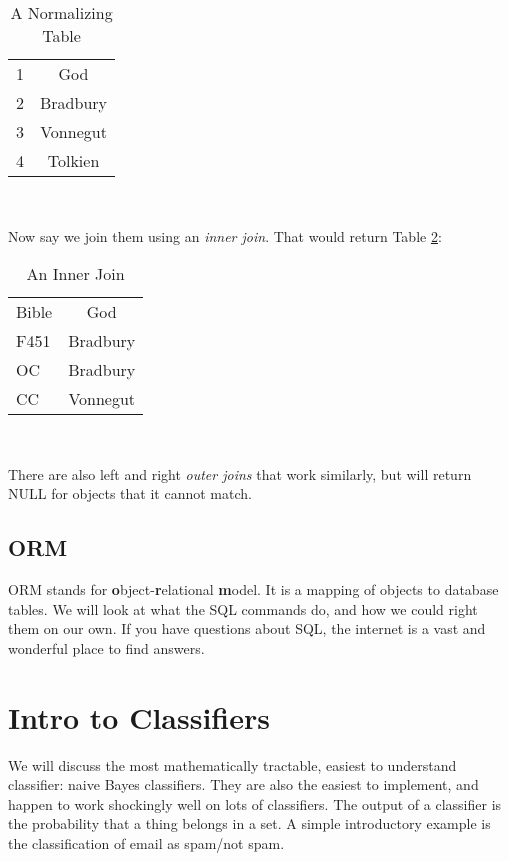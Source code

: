 \documentclass[12pt,letter]{article}
\begin{document}
\begin{table}[htbp]\centering
 \caption{A Normalizing Table}
\label{aNormalizer}
\begin{tabular}{l|c}\hline
1 & God \\
2 & Bradbury \\
3 & Vonnegut \\
4 & Tolkien \\
\hline
\end{tabular} \\
\end{table}

Now say we join them using an \emph{inner join}. That would return
Table \ref{innerjoin}:
\begin{table}[h!]\centering
 \caption{An Inner Join}
\label{innerjoin}
\begin{tabular}{l|c}\hline
Bible & God \\
F451 & Bradbury \\
OC & Bradbury \\
CC & Vonnegut \\
\hline
\end{tabular} \\
\end{table}
There are also left and right \emph{outer joins} that work similarly,
but will return NULL for objects that it cannot match.

\subsection{ORM}

ORM stands for \textbf{o}bject-\textbf{r}elational \textbf{m}odel. It is a mapping of objects to
database tables. We will look at what the SQL commands do, and how we could right them
on our own. If you have questions about SQL, the internet is a vast
and wonderful place to find answers. 


\section{Intro to Classifiers}

We will discuss the most mathematically tractable, easiest to
understand classifier: naive Bayes classifiers. They are also the
easiest to implement, and happen to work shockingly well on lots of
classifiers. The output of a classifier is the probability that a
thing belongs in a set. A simple introductory example is the
classification of email as spam/not spam. 
\end{document}
